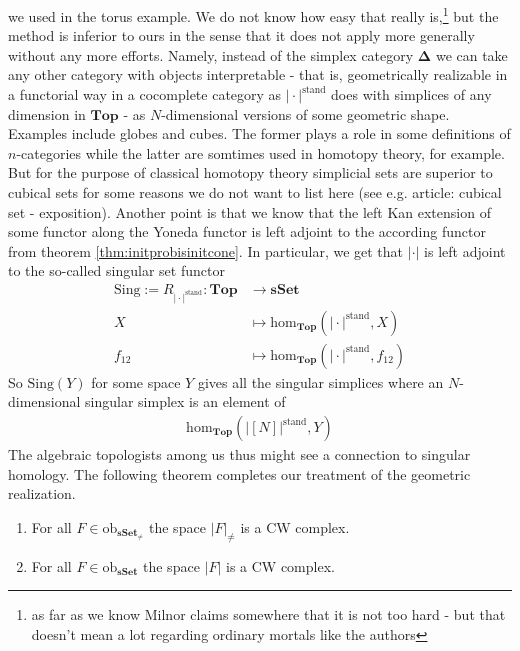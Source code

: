 we used in the torus example. We do not know how easy that really is,\footnote{as far as we know Milnor claims somewhere that it is not too hard - but that doesn't mean a lot regarding ordinary mortals like the authors} but the method is inferior to ours in the sense that it does not apply more generally without any more efforts. Namely, instead of the simplex category $\mathbf{\Delta}$ we can take any other category with objects interpretable - that is, geometrically realizable in a functorial way in a cocomplete category as $\vert \cdot \vert^{\textrm{stand}}$ does with simplices of any dimension in $\mathbf{Top}$ - as $N$-dimensional versions of some geometric shape. Examples include globes and cubes. The former plays a role in some definitions of $n$-categories while the latter are somtimes used in homotopy theory, for example. But for the purpose of classical homotopy theory simplicial sets are superior to cubical sets for some reasons we do not want to list here (see e.g. \cite{wiki-nlab0000} article: cubical set - exposition). Another point is that we know that the left Kan extension of some functor along the Yoneda functor is left adjoint to the according functor from theorem \ref{thm:initprobisinitcone}. In particular, we get that $\vert \cdot \vert$ is left adjoint to the so-called singular set functor
\begin{align*}
  \mathrm{Sing}
  :=
  R_{\vert \cdot \vert^{\textrm{stand}}}
  \colon
  \mathbf{Top}
  &\rightarrow
  \mathbf{sSet}
  \\
  X
  &\mapsto
  \mathrm{hom}_{\mathbf{Top}}
  \left(
    \vert
      \cdot
    \vert^{\textrm{stand}},
    X
  \right)
  \\
  f_{12}
  &\mapsto
  \mathrm{hom}_{\mathbf{Top}}
  \left(
    \vert
      \cdot
    \vert^{\textrm{stand}},
    f_{12}
  \right)
\end{align*}
So $\mathrm{Sing}(Y)$ for some space $Y$ gives all the singular simplices where an $N$-dimensional singular simplex is an element of
\begin{align*}
  \mathrm{hom}_{\mathbf{Top}}
  \left(
    \left\vert
      [N]
    \right\vert^{\textrm{stand}},
    Y
  \right)
\end{align*}
The algebraic topologists among us thus might see a connection to singular homology. The following theorem completes our treatment of the geometric realization.
\\
\begin{thm}
\label{thm:ssetcwcompex}
\begin{enumerate}
\item[(1)]
For all $F \in \mathrm{ob}_{\mathbf{sSet}_{\neq}}$ the space $\vert F \vert_{\neq}$ is a CW complex.
\item[(2)]
For all $F \in \mathrm{ob}_{\mathbf{sSet}}$ the space $\vert F \vert$ is a CW complex.
\end{enumerate}
\end{thm}
